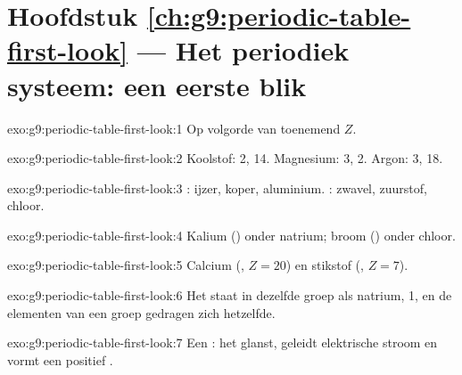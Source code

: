 \section*{Hoofdstuk \ref{ch:g9:periodic-table-first-look} --- Het periodiek systeem: een eerste blik}

\begin{solution}{exo:g9:periodic-table-first-look:1}
Op volgorde van toenemend  $Z$.
\end{solution}

\begin{solution}{exo:g9:periodic-table-first-look:2}
Koolstof:  2,  14. Magnesium:  3,  2. Argon:
 3,  18.
\end{solution}

\begin{solution}{exo:g9:periodic-table-first-look:3}
: ijzer, koper, aluminium. : zwavel, zuurstof,
chloor.
\end{solution}

\begin{solution}{exo:g9:periodic-table-first-look:4}
Kalium () onder natrium; broom () onder chloor.
\end{solution}

\begin{solution}{exo:g9:periodic-table-first-look:5}
Calcium (, $Z = 20$) en stikstof (, $Z = 7$).
\end{solution}

\begin{solution}{exo:g9:periodic-table-first-look:6}
Het staat in dezelfde groep als natrium,  1, en de elementen van
een groep gedragen zich hetzelfde.
\end{solution}

\begin{solution}{exo:g9:periodic-table-first-look:7}
Een : het glanst, geleidt elektrische stroom en vormt een positief
.
\end{solution}

